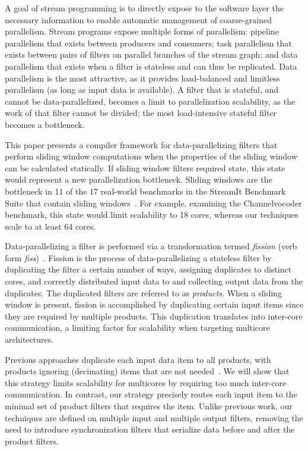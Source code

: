 A goal of stream programming is to directly expose to the software
layer the necessary information to enable automatic management of
coarse-grained parallelism.  Stream programs expose multiple forms of
parallelism: pipeline parallelism that exists between producers and
consumers; task parallelism that exists between pairs of filters on
parallel branches of the stream graph; and data parallelism that
exists when a filter is stateless and can thus be replicated.  Data
parallelism is the most attractive, as it provides load-balanced and
limitless parallelism (as long as input data is available).  A filter
that is stateful, and cannot be data-parallelized, becomes a limit to
parallelization scalability, as the work of that filter cannot be
divided; the most load-intensive stateful filter becomes a
bottleneck.

This paper presents a compiler framework for data-parallelizing
filters that perform sliding window computations when the properties
of the sliding window can be calculated statically.  If sliding window
filters required state, this state would represent a new
parallelization bottleneck.  Sliding windows are the bottleneck in 11
of the 17 real-world benchmarks in the StreamIt Benchmark Suite that
contain sliding windows~\cite{streamit-suite}.  For example, examining
the Channelvocoder benchmark, this state would limit scalability to 18
cores, whereas our techniques scale to at least 64 cores.

Data-parallelizing a filter is performed via a transformation termed
{\it fission} (verb form {\it fiss})~\cite{streamit-asplos}.  Fission
is the process of data-parallelizing a stateless filter by duplicating
the filter a certain number of ways, assigning duplicates to distinct
cores, and correctly distributed input data to and collecting output
data from the duplicates.  The duplicated filters are referred to as
{\it products}.  When a sliding window is present, fission is
accomplished by duplicating certain input items since they are
required by multiple products.  This duplication translates into
inter-core communication, a limiting factor for scalability when
targeting multicore architectures.

Previous approaches duplicate each input data item to all products,
with products ignoring (decimating) items that are not
needed~\cite{streamit-asplos}.  We will show that this strategy limits
scalability for multicores by requiring too much inter-core
communication.  In contrast, our strategy precisely routes each input
item to the minimal set of product filters that requires the item.
Unlike previous work, our techniques are defined on
multiple input and multiple output filters, removing the need to
introduce synchronization filters that serialize data before and
after the product filters.  

